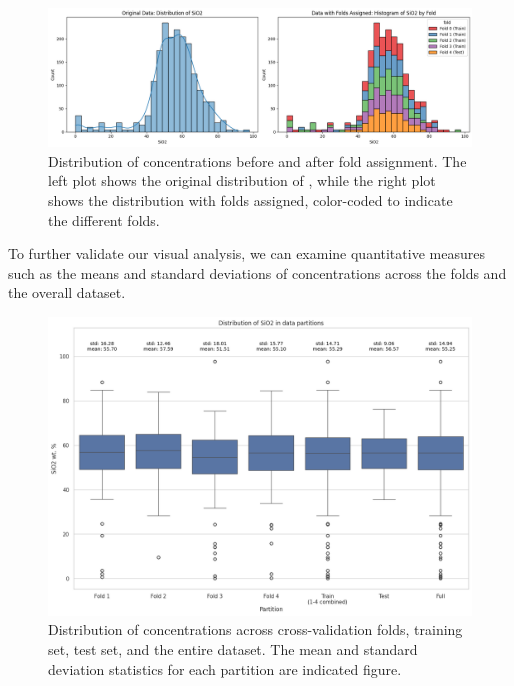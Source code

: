 \begin{figure}
    \centering
    \includegraphics[width=\textwidth]{images/original_and_post_fold.png}
    \caption{Distribution of  concentrations before and after fold assignment. The left plot shows the original distribution of , while the right plot shows the distribution with folds assigned, color-coded to indicate the different folds.}
    \label{fig:original_and_post_fold_plot}
\end{figure}


To further validate our visual analysis, we can examine quantitative measures such as the means and standard deviations of  concentrations across the folds and the overall dataset.

\begin{figure}
    \centering
    \includegraphics[width=\textwidth]{images/distribution_plot.png}
    \caption{Distribution of  concentrations across cross-validation folds, training set, test set, and the entire dataset. The mean and standard deviation statistics for each partition are indicated figure.}
    \label{fig:siO2_distribution}
\end{figure}

